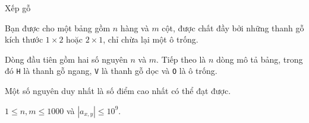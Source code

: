 \begin{problem}[
  input = unblock.inp, output = unblock.out,
  time = 2, memory = 512, points = 100,
  author = {Phan Bình Nguyên Lâm},
]{Xếp gỗ}

Bạn được cho một bảng gồm $n$ hàng và $m$ cột, được chất đầy bởi những thanh
gỗ kích thước $1 \times 2$ hoặc $2 \times 1$, chỉ chừa lại một ô trống.

\InputFile
Dòng đầu tiên gồm hai số nguyên $n$ và $m$. Tiếp theo là $n$ dòng mô tả bảng,
trong đó \texttt{H} là thanh gỗ ngang, \texttt{V} là thanh gỗ dọc và
\texttt{O} là ô trống.

\OutputFile
Một số nguyên duy nhất là số điểm cao nhất có thể đạt được.

\Constraints
$1 \le n, m \le 1000$ và $|a_{x,y}| \le 10^9$.

\begin{subtasks}
\end{subtasks}

\Examples
\begin{example}
%
\end{example}
\end{problem}
